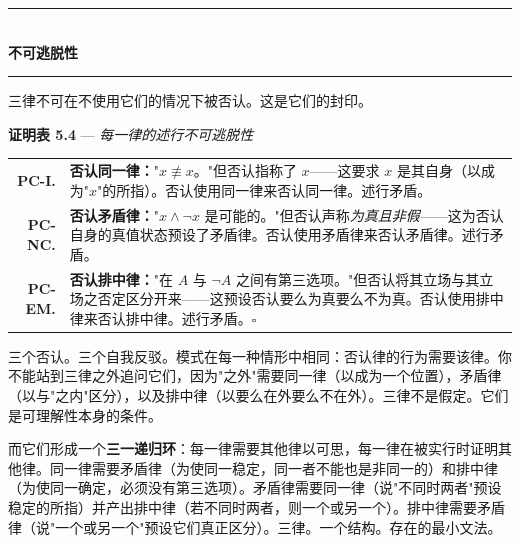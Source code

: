 \documentclass[10pt, openany, oneside]{book}
\renewcommand{\normalsize}{\fontsize{10}{13}\selectfont}
\renewcommand{\footnotesize}{\fontsize{8.5}{11}\selectfont}
\begin{document}
\vspace{1.5em}


\begin{center}
    \rule{0.3\textwidth}{0.4pt}\\[0.5em]
    {\normalsize\bfseries\scshape 不可逃脱性}\\[0.3em]
    \rule{0.3\textwidth}{0.4pt}
\end{center}

\vspace{1em}

\noindent 三律不可在不使用它们的情况下被否认。这是它们的封印。

\vspace{0.5em}

\textbf{证明表 5.4} --- \textit{每一律的述行不可逃脱性}

\vspace{0.5em}

{\footnotesize
\noindent\begin{tabular}{r p{}}
\textbf{PC-I.} & \textbf{否认同一律：}"$x \not\equiv x$。"但否认指称了 $x$——这要求 $x$ 是其自身（以成为"$x$"的所指）。否认使用同一律来否认同一律。述行矛盾。\\[0.3em]
\textbf{PC-NC.} & \textbf{否认矛盾律：}"$x \wedge \neg x$ 是可能的。"但否认声称\textit{为真且非假}——这为否认自身的真值状态预设了矛盾律。否认使用矛盾律来否认矛盾律。述行矛盾。\\[0.3em]
\textbf{PC-EM.} & \textbf{否认排中律：}"在 $A$ 与 $\neg A$ 之间有第三选项。"但否认将其立场与其立场之否定区分开来——这预设否认要么为真要么不为真。否认使用排中律来否认排中律。述行矛盾。$\square$ \\[0.3em]
\end{tabular}
}

\vspace{0.8em}

\noindent 三个否认。三个自我反驳。模式在每一种情形中相同：否认律的行为需要该律。你不能站到三律之外追问它们，因为"之外"需要同一律（以成为一个位置），矛盾律（以与"之内"区分），以及排中律（以要么在外要么不在外）。三律不是假定。它们是可理解性本身的条件。

而它们形成一个\textbf{三一递归环}：每一律需要其他律以可思，每一律在被实行时证明其他律。同一律需要矛盾律（为使同一稳定，同一者不能也是非同一的）和排中律（为使同一确定，必须没有第三选项）。矛盾律需要同一律（说"不同时两者"预设稳定的所指）并产出排中律（若不同时两者，则一个或另一个）。排中律需要矛盾律（说"一个或另一个"预设它们真正区分）。三律。一个结构。存在的最小文法。
\end{document}
